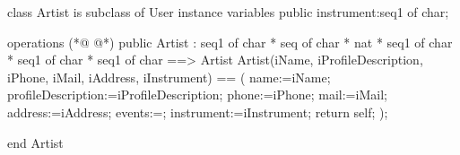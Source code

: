 \begin{vdmpp}[breaklines=true]
class Artist is subclass of User 
instance variables
  public instrument:seq1 of char;

operations
(*@
\label{Artist:6}
@*)
  public  Artist : seq1 of char * seq of char * nat * seq1 of char * seq1 of char * seq1 of char ==> Artist
  Artist(iName, iProfileDescription, iPhone, iMail, iAddress, iInstrument) == (
   name:=iName;
   profileDescription:=iProfileDescription;
   phone:=iPhone;
   mail:=iMail;
   address:=iAddress;
   events:={};
   instrument:=iInstrument;
   return self;
  );
  
end Artist
\end{vdmpp}
